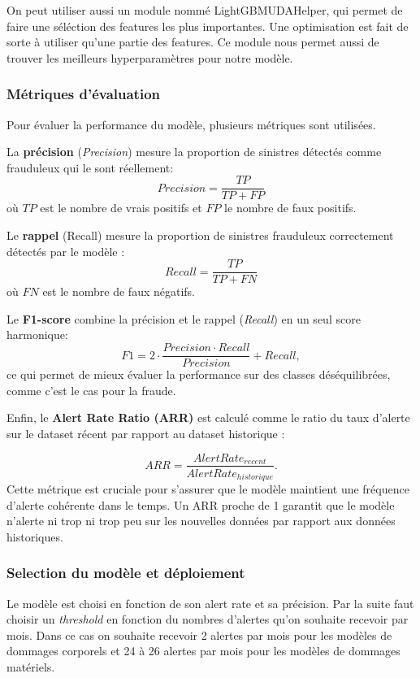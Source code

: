 \documentclass [twoside,openright,a4paper,11pt,french] {report}
\begin{document}
On peut utiliser aussi un module nommé LightGBMUDAHelper, qui permet de faire une séléction des features 
les plus importantes. Une optimisation est fait de sorte à utiliser qu'une partie des features. 
Ce module nous permet aussi de trouver les meilleurs hyperparamètres pour notre modèle.

\subsubsection{Métriques d'évaluation}

Pour évaluer la performance du modèle, plusieurs métriques sont utilisées. 

La \textbf{précision} (\textit{Precision}) mesure la proportion de sinistres détectés comme frauduleux qui le sont réellement: 
$$
Precision = \frac{TP}{TP + FP}
$$
où $TP$ est le nombre de vrais positifs et $FP$ le nombre de faux positifs.


Le \textbf{rappel} (Recall) mesure la proportion de sinistres frauduleux correctement détectés par le modèle :
$$
Recall = \frac{TP}{TP + FN}
$$
où $FN$ est le nombre de faux négatifs.

Le \textbf{F1-score} combine la précision et le rappel (\textit{Recall}) en un seul score harmonique: 
$$
F1 = 2 \cdot \frac{Precision \cdot Recall}{Precision} + {Recall},
$$
ce qui permet de mieux évaluer la performance sur des classes déséquilibrées, comme c'est le cas pour la fraude.

Enfin, le \textbf{Alert Rate Ratio (ARR)} est calculé comme le ratio du taux d'alerte sur le dataset récent par rapport au dataset historique :

$$
ARR = \frac{Alert Rate_{recent}}{Alert Rate_{historique}}.
$$
Cette métrique est cruciale pour s'assurer que le modèle maintient une fréquence d'alerte cohérente dans le temps.
Un ARR proche de 1 garantit que le modèle n'alerte ni trop ni trop peu sur les nouvelles données par rapport aux données historiques.

\subsubsection{Selection du modèle et déploiement}

Le modèle est choisi en fonction de son alert rate et sa précision. Par la suite faut choisir un 
\textit{threshold} en fonction du nombres d'alertes qu'on souhaite recevoir par mois. 
Dans ce cas on souhaite recevoir 2 alertes par mois pour les modèles de dommages corporels 
et 24 à 26 alertes par mois pour les modèles de dommages matériels. 
\end{document}
